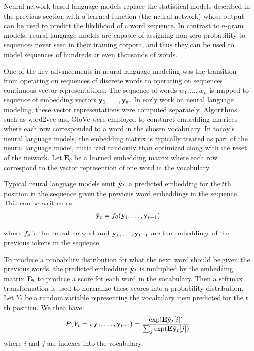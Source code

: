Neural network-based language models replace the statistical models described in the previous section with a learned function (the neural network) whose output can be used to predict the likelihood of a word sequence.
In contrast to $n$-gram models, neural language models are capable of assigning non-zero probability to sequences never seen in their training corpora, and thus they can be used to model sequences of hundreds or even thousands of words.

One of the key advancements in neural language modeling was the transition from operating on sequences of discrete words to operating on sequences continuous vector representations.
The sequence of words $w_1, \ldots, w_n$ is mapped to sequence of embedding vectors $\mathbf{y}_1, \ldots, \mathbf{y}_n$.
In early work on neural language modeling, these vector representations were computed separately.
Algorithms such as word2vec \citep{mikolov2013word2vec} and GloVe \citep{pennington2014glove} were employed to consturct embedding matrices where each row corresponded to a word in the chosen vocabulary.
In today's neural language models, the embedding matrix is typically treated as part of the neural language model, initialized randomly than optimized along with the reset of the network.
Let $\mathbf{E}_\theta$ be a learned embedding matrix where each row correspond to the vector represention of one word in the vocabulary.

Typical neural language models emit $\hat{\mathbf{y}}_t$, a predicted embedding for the $t$th position in the sequence given the previous word embeddings in the sequence. This can be written as
\begin{align}
    \hat{\mathbf{y}}_t = f_\theta(\mathbf{y}_1, \ldots, \mathbf{y}_{t-1})
    \label{eq:lm_feq}
\end{align}

where $f_\theta$ is the neural network and $\mathbf{y}_1, \ldots, \mathbf{y}_{t-1}$ are the embeddings of the previous tokens in the sequence.

To produce a probability distribution for what the next word should be given the previous words, the predicted embedding $\hat{\mathbf{y}}_t$ is multiplied by the embedding matrix $\mathbf{E}_\theta$ to produce a score for each word in the vocabulary.
Then a softmax transformation is used to normalize these scores into a probability distribution.
Let $Y_t$ be a random variable representing the vocabulary item predicted for the $t$th position. We then have:
\begin{align}
    \label{equation:vocab}
    P(Y_t=i | \mathbf{y}_1, \ldots, \mathbf{y}_{t-1}) = \frac{\exp(\mathbf{E}\hat{\mathbf{y}}_t[i])}{\sum_j\exp(\mathbf{E}\hat{\mathbf{y}}_t[j])}
\end{align}
where $i$ and $j$ are indexes into the vocabulary.

